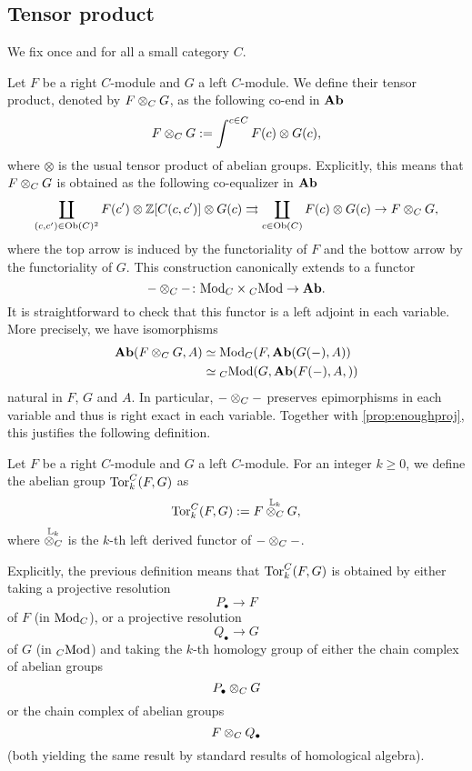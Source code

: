 \subsection{Tensor product}
We fix once and for all a small category $C$.
\begin{paragr}
   Let $F$ be a right $C$\nbd-module and $G$ a left $C$\nbd-module. We
  define their tensor product, denoted by $F\otimes_{C}G$, as the
  following co-end in $\mathbf{Ab}$
  \[
    F\otimes_{C}G := \int^{c \in C}F(c)\otimes G(c),
  \]
  where $\otimes$ is the usual tensor product of abelian
  groups. Explicitly, this means that $F\otimes_{C}G$ is obtained as the following
  co-equalizer in $\mathbf{Ab}$
  \[
    \coprod_{(c,c')\in \mathrm{Ob}(C)^2}F(c')\otimes\mathbb Z[C(c,c')]\otimes
    G(c) \rightrightarrows \coprod_{c \in \mathrm{Ob}(C)}F(c)\otimes G(c)
    \rightarrow F\otimes_{C}G,
  \]
  where the top arrow is induced by the functoriality of $F$ and the
  bottow arrow by the functoriality of $G$. This construction canonically extends to a functor
  \[
    - \otimes_{C} - \colon \mathrm{Mod}_{C}\times{}_{C}\mathrm{Mod} \to \mathbf{Ab}.
  \]
  It is straightforward to check that this functor is a left adjoint
  in each variable. More precisely, we have isomorphisms
  \[
    \begin{aligned}
      \mathbf{Ab}(F\otimes_{C}G,A)&\simeq
                                  \mathrm{Mod}_{C}(F,\mathbf{Ab}(G(-),A))\\
      &\simeq {}_{C}\mathrm{Mod}(G,\mathbf{Ab}(F(-),A,))
    \end{aligned}
  \]
  natural in $F$, $G$ and $A$. In particular, $-\otimes_{C}-$ preserves
  epimorphisms in each variable and thus is right exact in each
  variable. Together with \cref{prop:enoughproj}, this justifies the
  following definition.
\end{paragr}

\begin{definition}
  Let $F$ be a right $C$\nbd-module and $G$ a left $C$\nbd-module. For
  an integer $k \geq 0$, we
  define the abelian group $\mathrm{Tor}^{C}_{k}(F,G)$ as
  \[
    \mathrm{Tor}^{C}_{k}(F,G) := F \overset{\mathbb{L}_k}{\otimes_{C}} G,
  \]
  where $\overset{\mathbb{L}_k}{\otimes_{C}}$ is the $k$\nbd-th left
  derived functor of $-\otimes_{C}-$.
\end{definition}
\begin{paragr}
  Explicitly, the previous definition means that $\mathrm{Tor}^{C}_{k}(F,G)$ is
  obtained by either taking a projective resolution
  \[
    P_{\bullet} \to F
  \]
  of $F$ (in $\mathrm{Mod}_{C}$), or a projective resolution
  \[
    Q_{\bullet} \to G
  \]
  of $G$ (in ${}_{C}\mathrm{Mod}$) and taking the $k$\nbd-th homology group of
  either the chain complex of abelian groups
  \[P_{\bullet}\otimes_{C}G\]
  or the chain complex of abelian groups
  \[F\otimes_{C}Q_{\bullet}\] (both yielding the same result by standard
  results of homological algebra).
\end{paragr}
